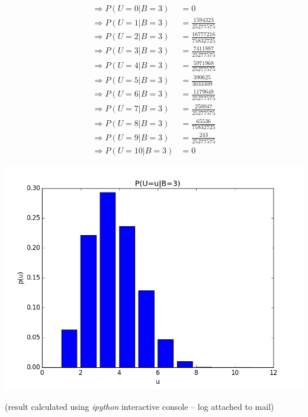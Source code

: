 \begin{align*}
\Rightarrow P(U=0|B=3) &= 0 \\
\Rightarrow P(U=1|B=3) &= \frac{1594323}{25277575} \\
\Rightarrow P(U=2|B=3) &= \frac{16777216}{75832725} \\
\Rightarrow P(U=3|B=3) &= \frac{7411887}{25277575} \\
\Rightarrow P(U=4|B=3) &= \frac{5971968}{25277575} \\
\Rightarrow P(U=5|B=3) &= \frac{390625}{3033309} \\
\Rightarrow P(U=6|B=3) &= \frac{1179648}{25277575} \\
\Rightarrow P(U=7|B=3) &= \frac{250047}{25277575} \\
\Rightarrow P(U=8|B=3) &= \frac{65536}{75832725} \\
\Rightarrow P(U=9|B=3) &= \frac{243}{25277575} \\
\Rightarrow P(U=10|B=3) &= 0
\end{align*}

\includegraphics[scale=0.5]{problems/prob3_plot.png}

(result calculated using \emph{ipython} interactive console -- log attached to mail)
